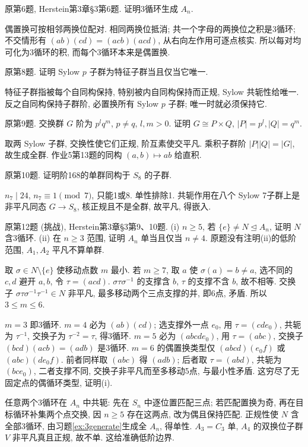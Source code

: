 \begin{exercise}\label{ex:3generate}原第6题, Herstein第3章\S3第6题. 证明3循环生成 $A_n$.\end{exercise}
\begin{solution}
偶置换可按相邻两换位配对. 相同两换位抵消; 共一个字母的两换位之积是3循环; 不交情形有 $(ab)(cd)=(acb)(acd)$, 从右向左作用可逐点核实. 所以每对均可化为3循环的积, 而每个3循环本来是偶置换.
\end{solution}
\begin{exercise}原第8题. 证明 Sylow $p$ 子群为特征子群当且仅当它唯一.\end{exercise}
\begin{solution}
特征子群指被每个自同构保持, 特别被内自同构保持而正规, Sylow 共轭性给唯一. 反之自同构保持子群阶, 必置换所有 Sylow $p$ 子群; 唯一时就必须保持它.
\end{solution}
\begin{exercise}原第9题. 交换群 $G$ 阶为 $p^lq^m$, $p\ne q$, $l,m>0$. 证明 $G\cong P\times Q$, $|P|=p^l,|Q|=q^m$.\end{exercise}
\begin{solution}
取两 Sylow 子群, 交换性使它们正规, 阶互素使交平凡. 乘积子群阶 $|P||Q|=|G|$, 故生成全群. 作业5第13题的同构 $(a,b)\mapsto ab$ 给直积.
\end{solution}
\begin{exercise}原第10题. 证明阶168的单群同构于 $S_8$ 的子群.\end{exercise}
\begin{solution}
$n_7\mid24$, $n_7\equiv1\pmod7$, 只能1或8. 单性排除1. 共轭作用在八个 Sylow 7子群上是非平凡同态 $G\to S_8$, 核正规且不是全群, 故平凡, 得嵌入.
\end{solution}
\begin{exercise}\label{ex:an}原第12题 (挑战), Herstein第3章\S3第9、10题. (i) $n\ge5$, 若 $\{e\}\ne N\trianglelefteq A_n$, 证明 $N$ 含3循环. (ii) 在 $n\ge3$ 范围, 证明 $A_n$ 单当且仅当 $n\ne4$. 原题没有注明(ii)的低阶范围, $A_1,A_2$ 平凡不算单群.\end{exercise}
\begin{solution}
取 $\sigma\in N\setminus\{e\}$ 使移动点数 $m$ 最小. 若 $m\ge7$, 取 $a$ 使 $\sigma(a)=b\ne a$, 选不同的 $c,d$ 避开 $a,b$, 令 $\tau=(acd)$. $\sigma\tau\sigma^{-1}$ 的支撑含 $b$, $\tau$ 的支撑不含 $b$, 故不相等. 交换子 $\sigma\tau\sigma^{-1}\tau^{-1}\in N$ 非平凡, 最多移动两个三点支撑的并, 即6点, 矛盾. 所以 $3\le m\le6$.

$m=3$ 即3循环. $m=4$ 必为 $(ab)(cd)$; 选支撑外一点 $e_0$, 用 $\tau=(cde_0)$, 共轭为 $\tau^{-1}$, 交换子为 $\tau^{-2}=\tau$, 得3循环. $m=5$ 必为 $(abcde_0)$, 用 $\tau=(abc)$, 交换子 $(bcd)(acb)=(adb)$ 是3循环. $m=6$ 的偶置换类型仅 $(abcd)(e_0f)$ 或 $(abc)(de_0f)$. 前者同样取 $(abc)$ 得 $(adb)$; 后者取 $\tau=(abd)$, 共轭为 $(bce_0)$, 二者支撑不同, 交换子非平凡而至多移动5点, 与最小性矛盾. 这穷尽了无固定点的偶循环类型, 证明(i).

任意两个3循环在 $A_n$ 中共轭: 先在 $S_n$ 中逐位置匹配三点; 若匹配置换为奇, 再在目标循环补集两个点交换, 因 $n\ge5$ 存在这两点, 改为偶且保持匹配. 正规性使 $N$ 含全部3循环, 由习题\ref{ex:3generate}生成全 $A_n$, 得单性. $A_3=C_3$ 单, $A_4$ 的双换位子群 $V$ 非平凡真且正规, 故不单. 这给准确低阶边界.
\end{solution}
